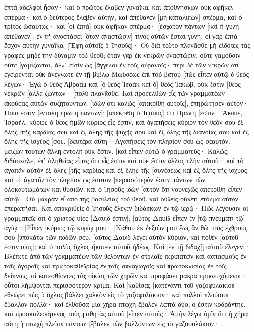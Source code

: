 ἑπτὰ ἀδελφοὶ ἦσαν· καὶ ὁ πρῶτος ἔλαβεν γυναῖκα, καὶ ἀποθνῄσκων οὐκ ἀφῆκεν σπέρμα· 
καὶ ὁ δεύτερος ἔλαβεν αὐτήν, καὶ ἀπέθανεν [μὴ καταλιπὼν] σπέρμα, καὶ ὁ τρίτος ὡσαύτως· 
καὶ [οἱ ἑπτὰ] οὐκ ἀφῆκαν σπέρμα· [ἔσχατον πάντων [καὶ ἡ γυνὴ ἀπέθανεν]. 
ἐν τῇ ἀναστάσει [ὅταν ἀναστῶσιν] τίνος αὐτῶν ἔσται γυνή; οἱ γὰρ ἑπτὰ ἔσχον αὐτὴν γυναῖκα. 
[Ἔφη αὐτοῖς ὁ Ἰησοῦς]· Οὐ διὰ τοῦτο πλανᾶσθε μὴ εἰδότες τὰς γραφὰς μηδὲ τὴν δύναμιν τοῦ θεοῦ; 
ὅταν γὰρ ἐκ νεκρῶν ἀναστῶσιν, οὔτε γαμοῦσιν οὔτε [γαμίζονται, ἀλλ᾽ εἰσὶν ὡς [ἄγγελοι ἐν τοῖς οὐρανοῖς· 
περὶ δὲ τῶν νεκρῶν ὅτι ἐγείρονται οὐκ ἀνέγνωτε ἐν τῇ βίβλῳ Μωϋσέως ἐπὶ τοῦ βάτου [πῶς εἶπεν αὐτῷ ὁ θεὸς λέγων· Ἐγὼ ὁ θεὸς Ἀβραὰμ καὶ [ὁ θεὸς Ἰσαὰκ καὶ ὁ] θεὸς Ἰακώβ; 
οὐκ ἔστιν [θεὸς νεκρῶν [ἀλλὰ ζώντων· [πολὺ πλανᾶσθε. 
Καὶ προσελθὼν εἷς τῶν γραμματέων ἀκούσας αὐτῶν συζητούντων, [ἰδὼν ὅτι καλῶς [ἀπεκρίθη αὐτοῖς], ἐπηρώτησεν αὐτόν· Ποία ἐστὶν [ἐντολὴ πρώτη πάντων]; 
[ἀπεκρίθη ὁ Ἰησοῦς] ὅτι Πρώτη [ἐστίν· Ἄκουε, Ἰσραήλ, κύριος ὁ θεὸς ἡμῶν κύριος εἷς ἐστιν, 
καὶ ἀγαπήσεις κύριον τὸν θεόν σου ἐξ ὅλης [τῆς καρδίας σου καὶ ἐξ ὅλης τῆς ψυχῆς σου καὶ ἐξ ὅλης τῆς διανοίας σου καὶ ἐξ ὅλης τῆς ἰσχύος [σου. 
[δευτέρα αὕτη· Ἀγαπήσεις τὸν πλησίον σου ὡς σεαυτόν. μείζων τούτων ἄλλη ἐντολὴ οὐκ ἔστιν. 
[καὶ εἶπεν αὐτῷ ὁ γραμματεύς· Καλῶς, διδάσκαλε, ἐπ᾽ ἀληθείας εἶπες ὅτι εἷς ἐστιν καὶ οὐκ ἔστιν ἄλλος πλὴν αὐτοῦ· 
καὶ τὸ ἀγαπᾶν αὐτὸν ἐξ ὅλης [τῆς καρδίας καὶ ἐξ ὅλης τῆς [συνέσεως καὶ ἐξ ὅλης τῆς ἰσχύος καὶ τὸ ἀγαπᾶν τὸν πλησίον ὡς ἑαυτὸν [περισσότερόν ἐστιν πάντων τῶν ὁλοκαυτωμάτων καὶ θυσιῶν. 
καὶ ὁ Ἰησοῦς ἰδὼν [αὐτὸν ὅτι νουνεχῶς ἀπεκρίθη εἶπεν αὐτῷ· Οὐ μακρὰν εἶ ἀπὸ τῆς βασιλείας τοῦ θεοῦ. καὶ οὐδεὶς οὐκέτι ἐτόλμα αὐτὸν ἐπερωτῆσαι. 
Καὶ ἀποκριθεὶς ὁ Ἰησοῦς ἔλεγεν διδάσκων ἐν τῷ ἱερῷ· Πῶς λέγουσιν οἱ γραμματεῖς ὅτι ὁ χριστὸς υἱὸς [Δαυίδ ἐστιν]; 
[αὐτὸς Δαυὶδ εἶπεν ἐν [τῷ πνεύματι τῷ] ἁγίῳ· [Εἶπεν [κύριος τῷ κυρίῳ μου· [Κάθου ἐκ δεξιῶν μου ἕως ἂν θῶ τοὺς ἐχθρούς σου [ὑποκάτω τῶν ποδῶν σου. 
[αὐτὸς Δαυὶδ λέγει αὐτὸν κύριον, καὶ πόθεν [αὐτοῦ ἐστιν υἱός]; καὶ ὁ πολὺς ὄχλος ἤκουεν αὐτοῦ ἡδέως. 
Καὶ [ἐν τῇ διδαχῇ αὐτοῦ ἔλεγεν]· Βλέπετε ἀπὸ τῶν γραμματέων τῶν θελόντων ἐν στολαῖς περιπατεῖν καὶ ἀσπασμοὺς ἐν ταῖς ἀγοραῖς 
καὶ πρωτοκαθεδρίας ἐν ταῖς συναγωγαῖς καὶ πρωτοκλισίας ἐν τοῖς δείπνοις, 
οἱ κατεσθίοντες τὰς οἰκίας τῶν χηρῶν καὶ προφάσει μακρὰ προσευχόμενοι· οὗτοι λήμψονται περισσότερον κρίμα. 
Καὶ [καθίσας [κατέναντι τοῦ γαζοφυλακίου ἐθεώρει πῶς ὁ ὄχλος βάλλει χαλκὸν εἰς τὸ γαζοφυλάκιον· καὶ πολλοὶ πλούσιοι ἔβαλλον πολλά· 
καὶ ἐλθοῦσα μία χήρα πτωχὴ ἔβαλεν λεπτὰ δύο, ὅ ἐστιν κοδράντης. 
καὶ προσκαλεσάμενος τοὺς μαθητὰς αὐτοῦ [εἶπεν αὐτοῖς· Ἀμὴν λέγω ὑμῖν ὅτι ἡ χήρα αὕτη ἡ πτωχὴ πλεῖον πάντων [ἔβαλεν τῶν βαλλόντων εἰς τὸ γαζοφυλάκιον· 
